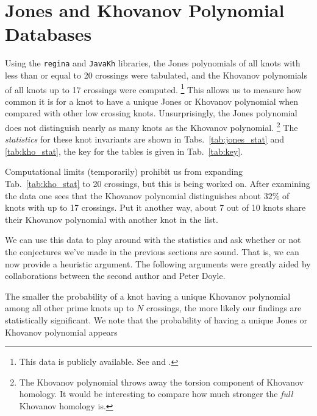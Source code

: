 \documentclass{article}
\theoremstyle{plain}
\begin{document}
    \section{Jones and Khovanov Polynomial Databases}
        Using the \texttt{regina} and \texttt{JavaKh} libraries, the Jones
        polynomials of all knots with less than or equal to 20 crossings were
        tabulated, and the Khovanov polynomials of all knots up to 17 crossings
        were computed.%
        \footnote{%
            This data is publicly available. See
            \cite{JonesData} and \cite{KhovanovData}.
        }
        This allows us to measure how common it is for a knot
        to have a unique Jones or Khovanov polynomial when compared with other
        low crossing knots. Unsurprisingly, the Jones polynomial does not
        distinguish nearly as many knots as the Khovanov polynomial.%
        \footnote{%
            The Khovanov polynomial throws away the torsion component of
            Khovanov homology. It would be interesting to compare how much
            stronger the \textit{full} Khovanov homology is.
        }
        The \textit{statistics} for these knot invariants are shown in
        Tabs.~\ref{tab:jones_stat} and \ref{tab:kho_stat}, the key for the
        tables is given in Tab.~\ref{tab:key}.
        \par\hfill\par
        Computational limits (temporarily) prohibit us from expanding
        Tab.~\ref{tab:kho_stat} to 20 crossings, but this is being worked on.
        After examining the data one sees that the Khovanov polynomial
        distinguishes about $32\%$ of knots with up to 17 crossings. Put it
        another way, about 7 out of 10 knots share their Khovanov polynomial
        with another knot in the list.
        \par\hfill\par
        We can use this data to play around with the statistics and ask whether or
        not the conjectures we've made in the previous sections are sound. That is,
        we can now provide a heuristic argument. The following arguments were
        greatly aided by collaborations between the second author and
        Peter Doyle.
        \par\hfill\par
        The smaller the probability of a knot having a unique Khovanov
        polynomial among all other prime knots up to $N$ crossings, the
        more likely our findings are statistically significant. We note that
        the probability of having a unique Jones or Khovanov polynomial appears
\end{document}
